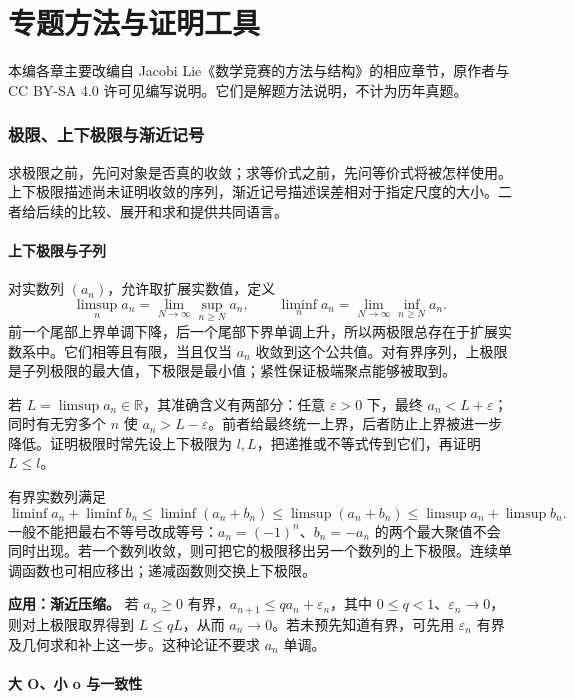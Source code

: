 \documentclass[12pt,fontset=fandol]{ctexart}
\begin{document}
\part{专题方法与证明工具}

本编各章主要改编自 Jacobi Lie《数学竞赛的方法与结构》的相应章节，原作者与 CC BY-SA 4.0 许可见编写说明。它们是解题方法说明，不计为历年真题。



\section{极限、上下极限与渐近记号}

求极限之前，先问对象是否真的收敛；求等价式之前，先问等价式将被怎样使用。上下极限描述尚未证明收敛的序列，渐近记号描述误差相对于指定尺度的大小。二者给后续的比较、展开和求和提供共同语言。

\subsection{上下极限与子列}

\label{app:limit-limsup}

对实数列 $(a_n)$，允许取扩展实数值，定义
\[
\limsup_na_n=\lim_{N\to\infty}\sup_{n\geq N}a_n,
\qquad
\liminf_na_n=\lim_{N\to\infty}\inf_{n\geq N}a_n.
\]
前一个尾部上界单调下降，后一个尾部下界单调上升，所以两极限总存在于扩展实数系中。它们相等且有限，当且仅当 $a_n$ 收敛到这个公共值。对有界序列，上极限是子列极限的最大值，下极限是最小值；紧性保证极端聚点能够被取到。

若 $L=\limsup a_n\in\mathbb R$，其准确含义有两部分：任意 $\varepsilon>0$ 下，最终 $a_n<L+\varepsilon$；同时有无穷多个 $n$ 使 $a_n>L-\varepsilon$。前者给最终统一上界，后者防止上界被进一步降低。证明极限时常先设上下极限为 $l,L$，把递推或不等式传到它们，再证明 $L\leq l$。

有界实数列满足
\[
\liminf a_n+\liminf b_n\leq\liminf(a_n+b_n)
\leq\limsup(a_n+b_n)\leq\limsup a_n+\limsup b_n.
\]
一般不能把最右不等号改成等号：$a_n=(-1)^n$、$b_n=-a_n$ 的两个最大聚值不会同时出现。若一个数列收敛，则可把它的极限移出另一个数列的上下极限。连续单调函数也可相应移出；递减函数则交换上下极限。

\textbf{应用：渐近压缩。} 若 $a_n\geq0$ 有界，$a_{n+1}\leq q a_n+\varepsilon_n$，其中 $0\leq q<1$、$\varepsilon_n\to0$，则对上极限取界得到 $L\leq qL$，从而 $a_n\to0$。若未预先知道有界，可先用 $\varepsilon_n$ 有界及几何求和补上这一步。这种论证不要求 $a_n$ 单调。

\subsection{大 O、小 o 与一致性}
\end{document}
